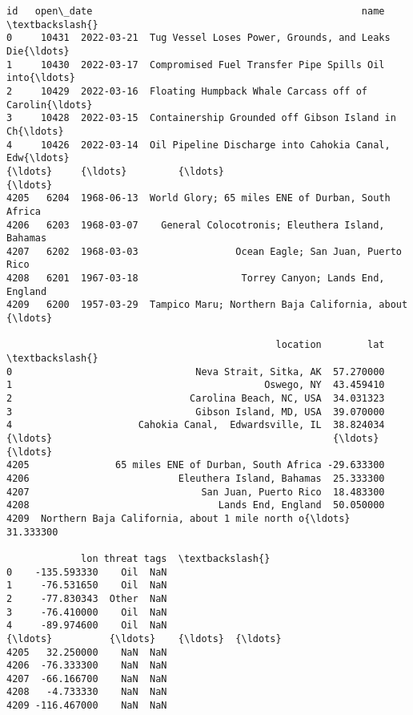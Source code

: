 \documentclass[11pt]{article}
\makeatletter
\newcommand{\boxspacing}{\kern\kvtcb@left@rule\kern\kvtcb@boxsep}
\newcommand{\prompt}[4]{
        {\ttfamily\llap{{\color{#2}[#3]:\hspace{3pt}#4}}\vspace{-\baselineskip}}
    }
\makeatother
\begin{document}
            \begin{tcolorbox}[breakable, size=fbox, boxrule=.5pt, pad at break*=1mm, opacityfill=0]
\prompt{Out}{outcolor}{77}{\boxspacing}
\begin{Verbatim}[commandchars=\\\{\}]
         id   open\_date                                               name  \textbackslash{}
0     10431  2022-03-21  Tug Vessel Loses Power, Grounds, and Leaks Die{\ldots}
1     10430  2022-03-17  Compromised Fuel Transfer Pipe Spills Oil into{\ldots}
2     10429  2022-03-16  Floating Humpback Whale Carcass off of Carolin{\ldots}
3     10428  2022-03-15  Containership Grounded off Gibson Island in Ch{\ldots}
4     10426  2022-03-14  Oil Pipeline Discharge into Cahokia Canal, Edw{\ldots}
{\ldots}     {\ldots}         {\ldots}                                                {\ldots}
4205   6204  1968-06-13  World Glory; 65 miles ENE of Durban, South Africa
4206   6203  1968-03-07    General Colocotronis; Eleuthera Island, Bahamas
4207   6202  1968-03-03                 Ocean Eagle; San Juan, Puerto Rico
4208   6201  1967-03-18                  Torrey Canyon; Lands End, England
4209   6200  1957-03-29  Tampico Maru; Northern Baja California, about {\ldots}

                                               location        lat  \textbackslash{}
0                                Neva Strait, Sitka, AK  57.270000
1                                            Oswego, NY  43.459410
2                               Carolina Beach, NC, USA  34.031323
3                                Gibson Island, MD, USA  39.070000
4                      Cahokia Canal,  Edwardsville, IL  38.824034
{\ldots}                                                 {\ldots}        {\ldots}
4205               65 miles ENE of Durban, South Africa -29.633300
4206                          Eleuthera Island, Bahamas  25.333300
4207                              San Juan, Puerto Rico  18.483300
4208                                 Lands End, England  50.050000
4209  Northern Baja California, about 1 mile north o{\ldots}  31.333300

             lon threat tags  \textbackslash{}
0    -135.593330    Oil  NaN
1     -76.531650    Oil  NaN
2     -77.830343  Other  NaN
3     -76.410000    Oil  NaN
4     -89.974600    Oil  NaN
{\ldots}          {\ldots}    {\ldots}  {\ldots}
4205   32.250000    NaN  NaN
4206  -76.333300    NaN  NaN
4207  -66.166700    NaN  NaN
4208   -4.733330    NaN  NaN
4209 -116.467000    NaN  NaN


\end{Verbatim}
\end{tcolorbox}
\end{document}
